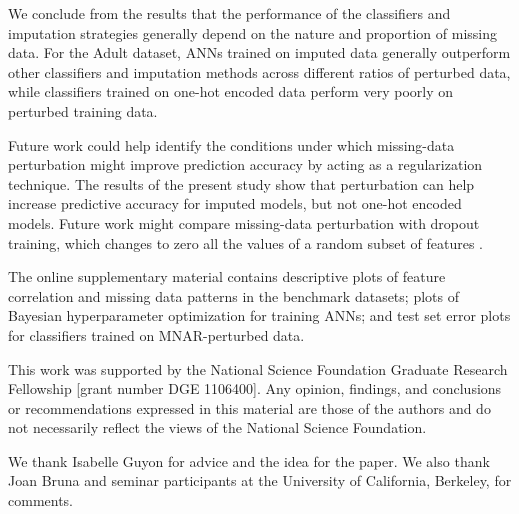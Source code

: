 \documentclass[10pt]{book}
\theoremstyle{definition}
\begin{document}
We conclude from the results that the performance of the classifiers and imputation strategies generally depend on the nature and proportion of missing data. For the Adult dataset, ANNs trained on imputed data generally outperform other classifiers and imputation methods across different ratios of perturbed data, while classifiers trained on one-hot encoded data perform very poorly on perturbed training data. 

Future work could help identify the conditions under which missing-data perturbation might improve prediction accuracy by acting as a regularization technique. The results of the present study show that perturbation can help increase predictive accuracy for imputed models, but not one-hot encoded models. Future work might compare missing-data perturbation with dropout training, which changes to zero all the values of a random subset of features \citep{hinton2012, maaten2013, wang2013}. 

\par
\vskip 14pt

The online supplementary material contains descriptive plots of feature correlation and missing data patterns in the benchmark datasets; plots of Bayesian hyperparameter optimization for training ANNs; and test set error plots for classifiers trained on MNAR-perturbed data. %

\par
\vskip 14pt

This work was supported by the National Science Foundation Graduate Research Fellowship [grant number DGE 1106400]. Any opinion, findings, and conclusions or recommendations expressed in this material are those of the authors and do not necessarily reflect the views of the National Science Foundation.
\par
\vskip 14pt

We thank Isabelle Guyon for advice and the idea for the paper. We also thank Joan Bruna and seminar participants at the University of California, Berkeley, for comments. %
\par
\clearpage
\end{document}

